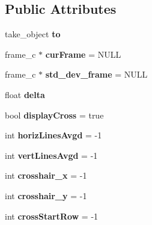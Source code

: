 \subsection*{Public Attributes}
\begin{DoxyCompactItemize}
\item 
\hypertarget{classframeWorker_aa2c60d0df60e344c1c3dd4693eb66715}{take\+\_\+object {\bfseries to}}\label{classframeWorker_aa2c60d0df60e344c1c3dd4693eb66715}

\item 
\hypertarget{classframeWorker_a55a43cc86cdfc2601d44733da8933f79}{frame\+\_\+c $\ast$ {\bfseries cur\+Frame} = N\+U\+L\+L}\label{classframeWorker_a55a43cc86cdfc2601d44733da8933f79}

\item 
\hypertarget{classframeWorker_ae46583be000ff6bd27fc4f4c4e8f6c9f}{frame\+\_\+c $\ast$ {\bfseries std\+\_\+dev\+\_\+frame} = N\+U\+L\+L}\label{classframeWorker_ae46583be000ff6bd27fc4f4c4e8f6c9f}

\item 
\hypertarget{classframeWorker_a291ee09bf02801c1f674c6d6a9970f93}{float {\bfseries delta}}\label{classframeWorker_a291ee09bf02801c1f674c6d6a9970f93}

\item 
\hypertarget{classframeWorker_a2fc4d1db515db48254318515e1540684}{bool {\bfseries display\+Cross} = true}\label{classframeWorker_a2fc4d1db515db48254318515e1540684}

\item 
\hypertarget{classframeWorker_ae376617e4851cae905a083ec7ac69317}{int {\bfseries horiz\+Lines\+Avgd} = -\/1}\label{classframeWorker_ae376617e4851cae905a083ec7ac69317}

\item 
\hypertarget{classframeWorker_ab0df53a41f956371904c774036e7891d}{int {\bfseries vert\+Lines\+Avgd} = -\/1}\label{classframeWorker_ab0df53a41f956371904c774036e7891d}

\item 
\hypertarget{classframeWorker_a7d3eeeef72727f9081183a96e3dcce88}{int {\bfseries crosshair\+\_\+x} = -\/1}\label{classframeWorker_a7d3eeeef72727f9081183a96e3dcce88}

\item 
\hypertarget{classframeWorker_acac9bced4d63764a75d0c5ee76e08704}{int {\bfseries crosshair\+\_\+y} = -\/1}\label{classframeWorker_acac9bced4d63764a75d0c5ee76e08704}

\item 
\hypertarget{classframeWorker_ab406fcd100750775d51c1f276503db2c}{int {\bfseries cross\+Start\+Row} = -\/1}\label{classframeWorker_ab406fcd100750775d51c1f276503db2c}


\end{DoxyCompactItemize}
